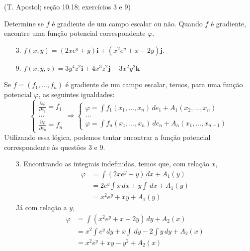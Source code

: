 \documentclass[../main.tex]{subfiles}
\begin{document}
	\begin{exercicio}{4}
		(T. Apostol; seção 10.18; exercícios 3 e 9)
		
		Determine se $f$ é gradiente de um campo escalar ou não. Quando $f$ é gradiente, encontre uma função potencial correspondente $\varphi$.
		\begin{enumerate} 
			\item[3.] $f(x,y)=(2xe^y+y)\textbf{i}+(x^2e^y+x-2y)\textbf{j}$.
			\item[9.] $f(x,y,z)=3y^4z^2\textbf{i}+4x^3z^2\textbf{j}-3x^2y^2\textbf{k}$
		\end{enumerate}
	\end{exercicio}
	\begin{solucao}
		Se $f=(f_1,\dots,f_n)$ é gradiente de um campo escalar, temos, para uma função potencial $\varphi$, as seguintes igualdades:
		\[
		\begin{cases}
			\frac{\partial \varphi}{\partial e_1}=f_1\\
			\dots\\
			\frac{\partial \varphi}{\partial e_n}=f_n
		\end{cases}
		\Rightarrow
		\begin{cases}
			\varphi = \int f_1(x_1,\dots, x_n)\, de_1+A_1(x_2, \dots,x_n)\\
			\dots\\
			\varphi = \int f_n(x_1,\dots, x_n)\, de_n+A_n(x_1,\dots, x_{n-1})
		\end{cases}
		\]
		Utilizando essa lógica, podemos tentar encontrar a função potencial correspondente às questões 3 e 9.
		\begin{enumerate}
			\item[3.] Encontrando as integrais indefinidas, temos que, com relação $x$,
			\begin{align*}
				\varphi
				&=\int (2xe^y+y) \, dx+A_1(y)\\
				&= 2e^y\int x \, dx+y\int\, dx + A_1(y)\\
				&= x^2e^y + xy + A_1(y)
			\end{align*}
			Já com relação a $y$,
			\begin{align*}
				\varphi
				&= \int (x^2e^y+x-2y) \, dy + A_2(x)\\
				&= x^2\int e^y \, dy + x\int \, dy -2\int y \, dy + A_2(x)\\
				&= x^2e^y + xy - y^2 + A_2(x) 
			\end{align*}
			

\end{enumerate}
\end{solucao}
\end{document}
